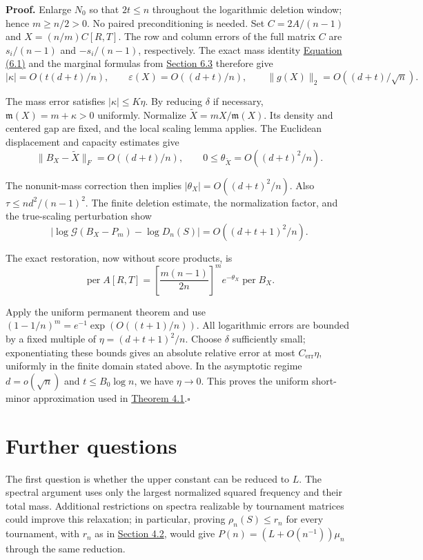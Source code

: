 \documentclass[11pt,a4paper]{article}
\newcommand{\paperref}[2]{\hyperref[#1]{#2}}
\begin{document}
\textbf{Proof.} Enlarge \(N_0\) so that \(2t\le n\) throughout the logarithmic deletion window; hence \(m\ge n/2>0\). No paired preconditioning is needed. Set \(C=2A/(n-1)\) and \(X=(n/m)C[R,T]\). The row and column errors of the full matrix \(C\) are \(s_i/(n-1)\) and \(-s_i/(n-1)\), respectively. The exact mass identity \paperref{eq-deletion-mass}{Equation (6.1)} and the marginal formulas from \paperref{sec-6.3}{Section 6.3} therefore give
\[|\kappa|=O(t(d+t)/n),\qquad \varepsilon(X)=O((d+t)/n),\qquad \|g(X)\|_2=O((d+t)/\sqrt n).\]

The mass error satisfies \(|\kappa|\le K\eta\). By reducing \(\delta\) if necessary, \(\mathfrak m(X)=m+\kappa>0\) uniformly. Normalize \(\widetilde X=mX/\mathfrak m(X)\). Its density and centered gap are fixed, and the local scaling lemma applies. The Euclidean displacement and capacity estimates give
\[\|B_X-\widetilde X\|_F=O((d+t)/n),\qquad 0\le\theta_{\widetilde X}=O((d+t)^2/n).\]

The nonunit-mass correction then implies \(|\theta_X|=O((d+t)^2/n)\). Also \(\tau\le nd^2/(n-1)^2\). The finite deletion estimate, the normalization factor, and the true-scaling perturbation show
\[|\log\mathcal G(B_X-P_m)-\log D_n(S)|=O((d+t+1)^2/n).\]

The exact restoration, now without score products, is
\[\operatorname{per}A[R,T]=\left[\frac{m(n-1)}{2n}\right]^m e^{-\theta_X}\operatorname{per}B_X.\]

Apply the uniform permanent theorem and use \((1-1/n)^m=e^{-1}\exp(O((t+1)/n))\). All logarithmic errors are bounded by a fixed multiple of \(\eta=(d+t+1)^2/n\). Choose \(\delta\) sufficiently small; exponentiating these bounds gives an absolute relative error at most \(C_{\mathrm{err}}\eta\), uniformly in the finite domain stated above. In the asymptotic regime \(d=o(\sqrt n)\) and \(t\le B_0\log n\), we have \(\eta\to0\). This proves the uniform short-minor approximation used in \paperref{thm-4.1}{Theorem 4.1}.\nobreak\hspace{.5em}\mbox{$\square$}

\section{Further questions}\label{sec-7}

The first question is whether the upper constant can be reduced to \(L\). The spectral argument uses only the largest normalized squared frequency and their total mass. Additional restrictions on spectra realizable by tournament matrices could improve this relaxation; in particular, proving \(\rho_n(S)\le r_n\) for every tournament, with \(r_n\) as in \paperref{sec-4.2}{Section 4.2}, would give \(P(n)=(L+O(n^{-1}))\mu_n\) through the same reduction.
\end{document}
